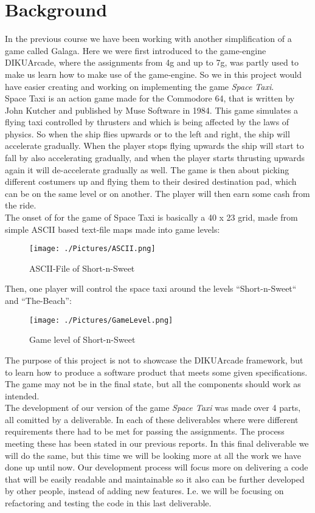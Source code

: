 \documentclass[../master.tex]{subfile}
\begin{document}
\section{Background}
In the previous course we have been working with another simplification of a game called Galaga. Here we were first introduced to the game-engine DIKUArcade, where the assignments from 4g and up to 7g, was partly used to make us learn how to make use of the game-engine. So we in this project would have easier creating and working on implementing the game \textit{Space Taxi}.\\

Space Taxi is an action game made for the Commodore 64, that is written by John Kutcher and published by Muse Software in 1984. This game simulates a flying taxi controlled by thrusters and which is being affected by the laws of physics. So when the ship flies upwards or to the left and right, the ship will accelerate gradually. When the player stops flying upwards the ship will start to fall by also accelerating gradually, and when the player starts thrusting upwards again it will de-accelerate gradually as well. The game is then about picking different costumers up and flying them to their desired destination pad, which can be on the same level or on another. The player will then earn some cash from the ride.\\

The onset of for the game of Space Taxi is basically a 40 x 23 grid, made from simple ASCII based text-file maps made into game levels:
\begin{figure}[h]
	\centering
	\texttt{[image: ./Pictures/ASCII.png]}
    \caption{ASCII-File of Short-n-Sweet}
\end{figure}

\newpage

Then, one player will control the space taxi around the levels ``Short-n-Sweet`` and ``The-Beach'':
\begin{figure}[h]
	\centering
	\texttt{[image: ./Pictures/GameLevel.png]}
    \caption{Game level of Short-n-Sweet}
\end{figure}

The purpose of this project is not to showcase the DIKUArcade framework, but to learn how to produce a software product that meets some given specifications. The game may not be in the final state, but all the components should work as intended.\\

The development of our version of the game \textit{Space Taxi} was made over 4 parts, all comitted by a deliverable. In each of these deliverables where were different requirements there had to be met for passing the assignments. The process meeting these has been stated in our previous reports. In this final deliverable we will do the same, but this time we will be looking more at all the work we have done up until now. Our development process will focus more on delivering a code that will be easily readable and maintainable so it also can be further developed by other people, instead of adding new features. I.e. we will be focusing on refactoring and testing the code in this last deliverable.
\end{document}
